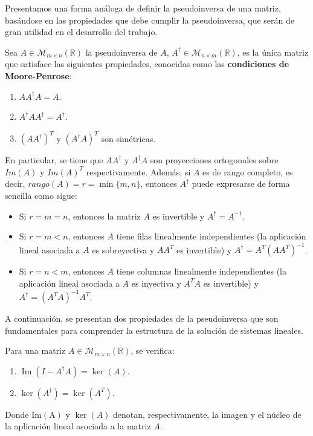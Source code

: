 Presentamos una forma análoga de definir la pseudoinversa de una matriz, basándose en las propiedades que debe cumplir la pseudoinversa, que serán de gran utilidad en el desarrollo del trabajo.
\begin{definicion}
    Sea $A \in \mathcal{M}_{m \times n}(\mathbb{R})$ la pseudoinversa de $A$, $A^{\dagger} \in \mathcal{M}_{n \times m}(\mathbb{R})$, es la única matriz que satisface las siguientes propiedades, conocidas como las \textbf{condiciones de Moore-Penrose}:

    \begin{enumerate}
        \item $A A^{\dagger} A = A$.
        \item $A^{\dagger} A A^{\dagger} = A^{\dagger}$.
        \item ${(A A^{\dagger})}^{T}$ y ${(A^{\dagger} A)}^{T}$ son simétricas.
    \end{enumerate}

    En particular, se tiene que $AA^{\dagger}$ y $A^{\dagger}A$ son proyecciones ortogonales sobre $Im(A)$ y ${Im(A)}^{T}$ respectivamente. Además, si $A$ es de rango completo, es decir, $rango(A) = r  = \min\{m, n\}$, entonces $A^{\dagger}$ puede expresarse de forma sencilla como sigue:

    \begin{itemize}
        \item Si $r = m = n$, entonces la matriz $A$ es invertible y $A^{\dagger} = A^{-1}$.
        \item Si $r = m < n$, entonces $A$ tiene filas linealmente independientes (la aplicación lineal asociada a $A$ es sobreyectiva y $AA^{T}$ es invertible) y $A^{\dagger} = A^{T}{(AA^{T})}^{-1}$.
        \item Si $r = n < m$, entonces $A$ tiene columnas linealmente independientes (la aplicación lineal asociada a $A$ es inyectiva y $A^{T}A$ es invertible) y $A^{\dagger} = {(A^{T}A)}^{-1} A^{T}$.
    \end{itemize}
\end{definicion}

A continuación, se presentan dos propiedades de la pseudoinversa que son fundamentales para comprender la estructura de la solución de sistemas lineales.

\begin{lema}\label{lema:propiedades-pseudoinversa}
    Para una matriz $A \in \mathcal{M}_{m \times n}(\mathbb{R})$, se verifica:

    \begin{enumerate}
        \item $\operatorname{Im}(I-A^{\dagger}A) = \ker(A)$.
        \item $\ker(A^{\dagger}) = \ker(A^{T})$.
    \end{enumerate}

    Donde $\operatorname{Im(A)}$ y $\ker(A)$ denotan, respectivamente, la imagen y el núcleo de la aplicación lineal asociada a la matriz $A$.
\end{lema}


